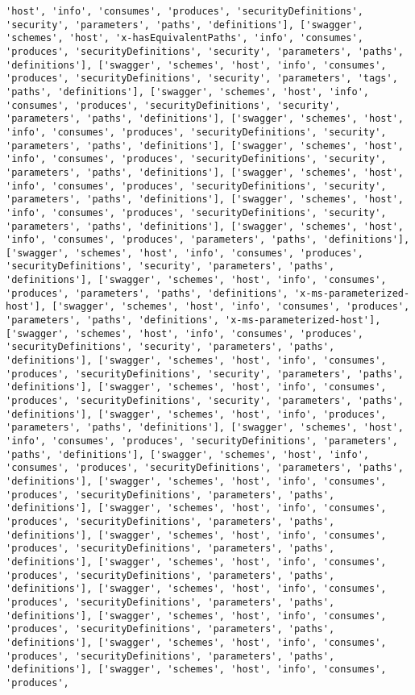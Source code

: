 \documentclass[11pt]{article}
\begin{document}
\begin{Verbatim}[commandchars=\\\{\}]
'host', 'info', 'consumes', 'produces', 'securityDefinitions', 'security', 'parameters', 'paths', 'definitions'], ['swagger', 'schemes', 'host', 'x-hasEquivalentPaths', 'info', 'consumes', 'produces', 'securityDefinitions', 'security', 'parameters', 'paths', 'definitions'], ['swagger', 'schemes', 'host', 'info', 'consumes', 'produces', 'securityDefinitions', 'security', 'parameters', 'tags', 'paths', 'definitions'], ['swagger', 'schemes', 'host', 'info', 'consumes', 'produces', 'securityDefinitions', 'security', 'parameters', 'paths', 'definitions'], ['swagger', 'schemes', 'host', 'info', 'consumes', 'produces', 'securityDefinitions', 'security', 'parameters', 'paths', 'definitions'], ['swagger', 'schemes', 'host', 'info', 'consumes', 'produces', 'securityDefinitions', 'security', 'parameters', 'paths', 'definitions'], ['swagger', 'schemes', 'host', 'info', 'consumes', 'produces', 'securityDefinitions', 'security', 'parameters', 'paths', 'definitions'], ['swagger', 'schemes', 'host', 'info', 'consumes', 'produces', 'securityDefinitions', 'security', 'parameters', 'paths', 'definitions'], ['swagger', 'schemes', 'host', 'info', 'consumes', 'produces', 'parameters', 'paths', 'definitions'], ['swagger', 'schemes', 'host', 'info', 'consumes', 'produces', 'securityDefinitions', 'security', 'parameters', 'paths', 'definitions'], ['swagger', 'schemes', 'host', 'info', 'consumes', 'produces', 'parameters', 'paths', 'definitions', 'x-ms-parameterized-host'], ['swagger', 'schemes', 'host', 'info', 'consumes', 'produces', 'parameters', 'paths', 'definitions', 'x-ms-parameterized-host'], ['swagger', 'schemes', 'host', 'info', 'consumes', 'produces', 'securityDefinitions', 'security', 'parameters', 'paths', 'definitions'], ['swagger', 'schemes', 'host', 'info', 'consumes', 'produces', 'securityDefinitions', 'security', 'parameters', 'paths', 'definitions'], ['swagger', 'schemes', 'host', 'info', 'consumes', 'produces', 'securityDefinitions', 'security', 'parameters', 'paths', 'definitions'], ['swagger', 'schemes', 'host', 'info', 'produces', 'parameters', 'paths', 'definitions'], ['swagger', 'schemes', 'host', 'info', 'consumes', 'produces', 'securityDefinitions', 'parameters', 'paths', 'definitions'], ['swagger', 'schemes', 'host', 'info', 'consumes', 'produces', 'securityDefinitions', 'parameters', 'paths', 'definitions'], ['swagger', 'schemes', 'host', 'info', 'consumes', 'produces', 'securityDefinitions', 'parameters', 'paths', 'definitions'], ['swagger', 'schemes', 'host', 'info', 'consumes', 'produces', 'securityDefinitions', 'parameters', 'paths', 'definitions'], ['swagger', 'schemes', 'host', 'info', 'consumes', 'produces', 'securityDefinitions', 'parameters', 'paths', 'definitions'], ['swagger', 'schemes', 'host', 'info', 'consumes', 'produces', 'securityDefinitions', 'parameters', 'paths', 'definitions'], ['swagger', 'schemes', 'host', 'info', 'consumes', 'produces', 'securityDefinitions', 'parameters', 'paths', 'definitions'], ['swagger', 'schemes', 'host', 'info', 'consumes', 'produces', 'securityDefinitions', 'parameters', 'paths', 'definitions'], ['swagger', 'schemes', 'host', 'info', 'consumes', 'produces', 'securityDefinitions', 'parameters', 'paths', 'definitions'], ['swagger', 'schemes', 'host', 'info', 'consumes', 'produces', 
\end{Verbatim}
\end{document}
